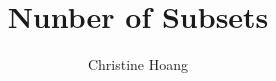 \documentclass{article}
\title{Nunber of Subsets}
\author{Christine Hoang}
\begin{document}
\maketitle

\section{}
\end{document}
